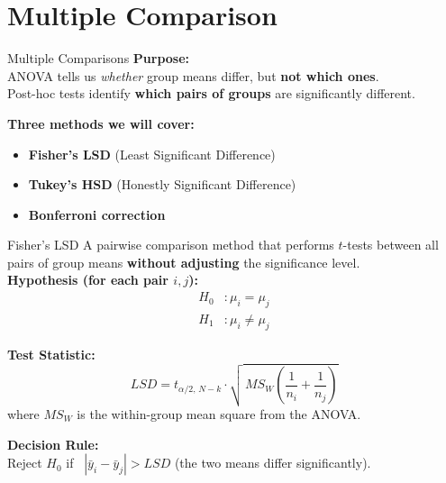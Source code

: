 \documentclass[aspectratio=169]{beamer}
\begin{document}
\section{Multiple Comparison}

\begin{frame}{Multiple Comparisons}
\textbf{Purpose:}\\
\vspace{4pt}
ANOVA tells us \textit{whether} group means differ, but \textbf{not which ones}.\\
Post-hoc tests identify \textbf{which pairs of groups} are significantly different.
\vspace{16pt}

\textbf{Three methods we will cover:}
\begin{itemize}\setlength{\itemsep}{6pt}
  \item \textbf{Fisher's LSD} (Least Significant Difference)
  \item \textbf{Tukey's HSD} (Honestly Significant Difference)
  \item \textbf{Bonferroni correction}
\end{itemize}
\end{frame}

\begin{frame}{Fisher's LSD}
A pairwise comparison method that performs $t$-tests between all pairs of group means \textbf{without adjusting} the significance level. \\
\vspace{5pt}
\textbf{Hypothesis (for each pair $i, j$):}
\[
\begin{aligned}
H_0 &: \mu_i = \mu_j \\
H_1 &: \mu_i \neq \mu_j
\end{aligned}
\]
\vspace{2pt}

\textbf{Test Statistic:}
\[
LSD = t_{\alpha/2,\, N-k} \cdot \sqrt{\,MS_W \left(\frac{1}{n_i} + \frac{1}{n_j}\right)}
\]
where $MS_W$ is the within-group mean square from the ANOVA.\\
\vspace{6pt}

\textbf{Decision Rule:}\\
Reject $H_0$ if \ $|\bar{y}_i - \bar{y}_j| > LSD$ \quad (the two means differ significantly).\\
\end{frame}
\end{document}
